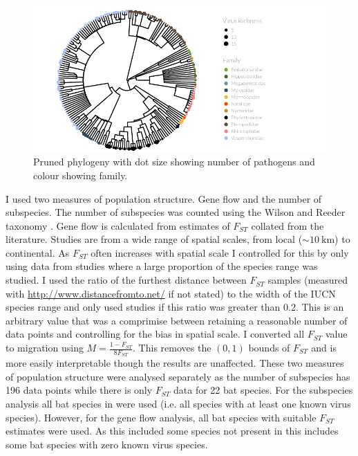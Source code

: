 \begin{knitrout}\footnotesize
{}\color{fgcolor}\begin{figure}[t]

{\centering \includegraphics[width=\textwidth]{figure/treePlot-1} 

}

\caption[Pruned phylogeny with dot size showing number of pathogens and colour showing family]{Pruned phylogeny with dot size showing number of pathogens and colour showing family.}\label{fig:treePlot}
\end{figure}


\end{knitrout}










I used two measures of population structure. 
Gene flow and the number of subspecies.
The number of subspecies was counted using the Wilson and Reeder taxonomy \cite{wilson2005mammal}.
Gene flow is calculated from estimates of $F_{ST}$ collated from the literature.
Studies are from a wide range of spatial scales, from local ($\sim\SI{10}{\kilo\metre}$) to continental.
As $F_{ST}$ often increases with spatial scale \cite{burland1999population, hulva2010mechanisms, o2015genetic, vonhof2015range} I controlled for this by only using data from studies where a large proportion of the species range was studied.
I used the ratio of the furthest distance between $F_{ST}$ samples (measured with \url{http://www.distancefromto.net/} if not stated) to the width of the IUCN species range \cite{iucn} and only used studies if this ratio was greater than 0.2.
This is an arbitrary value that was a comprimise between retaining a reasonable number of data points and controlling for the bias in spatial scale.
I converted all $F_{ST}$ value to migration using $M = \frac{1-F_{ST}}{8F_{ST}}$.
This removes the $(0, 1)$ bounds of $F_{ST}$ and is more easily interpretable though the results are unaffected. 
These two measures of population structure were analysed separately as the number of subspecies has 196 data points while there is only $F_{ST}$ data for 22 bat species.
For the subspecies analysis all bat species in \textcite{luis2013comparison} were used (i.e. all species with at least one known virus species).
However, for the gene flow analysis, all bat species with suitable $F_{ST}$ estimates were used.
As this included some species not present in \textcite{luis2013comparison} this includes some bat species with zero known virus species. 

